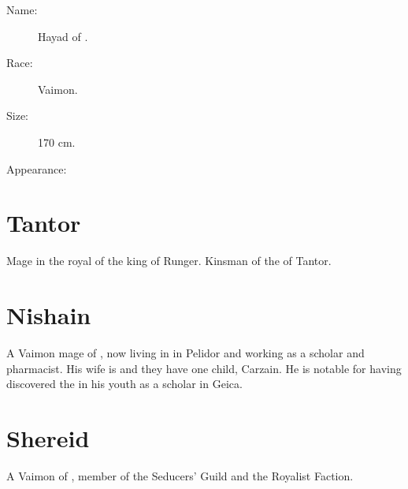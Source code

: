 \begin{description}
  \item[Name:] Hayad \Freid of \ClanGeican. 
  \item[Race:] Vaimon. 
  \item[Size:] 170 cm. 
  \item[Appearance:] 
\end{description}















\section{\Jirad Tantor}
Mage in the royal \ishrah{} of the king of Runger. 
Kinsman of the \scarv{} of Tantor. 
















\section{Nishain \Shachar}
A Vaimon mage of \ClanGeican, now living in \Redglen{} in Pelidor and working as a scholar and pharmacist. His wife is \Roanne{} \Delishe{} and they have one child, Carzain. He is notable for having discovered the \Kliffah{} \Gavron{} in his youth as a scholar in Geica.

















\section{Shereid}
A Vaimon of \ClanGeican, member of the Seducers' Guild and the Royalist Faction. 

